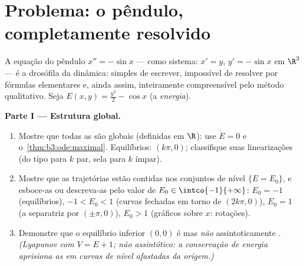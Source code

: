 \section{Problema: o pêndulo, completamente resolvido}

\begin{problem}\label{pb:b3:ode:1}
A equação do pêndulo $x'' = -\sin x$ --- como sistema: $x' =
y$, $y' = -\sin x$ em
$\R^2$ --- é a drosófila da dinâmica: simples de escrever,
impossível de resolver por fórmulas elementares e, ainda assim,
inteiramente compreensível pelo método qualitativo. Seja $E(x, y) = \frac{y^2}2 - \cos x$ (a
\emph{energia}).

\medskip
\noindent\textbf{Parte I --- Estrutura global.}
\begin{enumerate}
  \item Mostre que todas as  são globais (definidas em
        $\R$): use $\dot E = 0$ e o~\cref{thm:b3:ode:maximal}. Equilíbrios: $(k\pi, 0)$;
        classifique suas linearizações (do tipo  para $k$ par,
        sela para $k$ ímpar).
  \item Mostre que as trajetórias estão contidas nos conjuntos de nível
        $\{E = E_0\}$, e esboce-as ou descreva-as pelo valor de $E_0 \in \intco{-1}{+\infty}$: $E_0 = -1$
        (equilíbrios), $-1 < E_0 < 1$ (curvas fechadas em torno de $(2k\pi, 0)$), $E_0 = 1$
        (a separatriz por $(\pm\pi, 0)$), $E_0 > 1$ (gráficos sobre $x$:
        rotações).
  \item Demonstre que o equilíbrio inferior $(0,0)$ é  mas
        \emph{não} assintoticamente . \emph{(Lyapunov com $V = E + 1$;
        não assintótico: a conservação de energia aprisiona as 
        em curvas de nível afastadas da origem.)}
\end{enumerate}


\end{problem}
